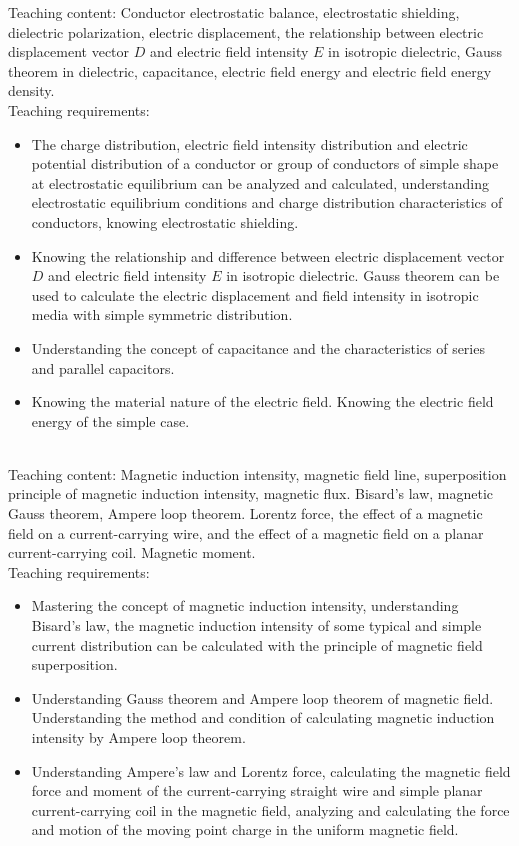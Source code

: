\documentclass[10pt,a4paper,oneside]{article}
\begin{document}
Teaching content: Conductor electrostatic balance, electrostatic shielding, dielectric polarization, electric displacement, the relationship between electric displacement vector $D$ and electric field intensity $E$ in isotropic dielectric, Gauss theorem in dielectric, capacitance, electric field energy and electric field energy density.\\

Teaching requirements:
\begin{itemize}
	\item The charge distribution, electric field intensity distribution and electric potential distribution of a conductor or group of conductors of simple shape at electrostatic equilibrium can be analyzed and calculated, understanding electrostatic equilibrium conditions and charge distribution characteristics of conductors, knowing electrostatic shielding.
	\item Knowing the relationship and difference between electric displacement vector $D$ and electric field intensity $E$ in isotropic dielectric. Gauss theorem can be used to calculate the electric displacement and field intensity in isotropic media with simple symmetric distribution.
	\item Understanding the concept of capacitance and the characteristics of series and parallel capacitors.
	\item Knowing the material nature of the electric field. Knowing the electric field energy of the simple case.
\end{itemize}
\\

Teaching content: Magnetic induction intensity, magnetic field line, superposition principle of magnetic induction intensity, magnetic flux. Bisard's law, magnetic Gauss theorem, Ampere loop theorem. Lorentz force, the effect of a magnetic field on a current-carrying wire, and the effect of a magnetic field on a planar current-carrying coil. Magnetic moment.\\

Teaching requirements:
\begin{itemize}
	\item Mastering the concept of magnetic induction intensity, understanding Bisard's law, the magnetic induction intensity of some typical and simple current distribution can be calculated with the principle of magnetic field superposition.
	\item Understanding Gauss theorem and Ampere loop theorem of magnetic field. Understanding the method and condition of calculating magnetic induction intensity by Ampere loop theorem.
	\item Understanding Ampere's law and Lorentz force, calculating the magnetic field force and moment of the current-carrying straight wire and simple planar current-carrying coil in the magnetic field, analyzing and calculating the force and motion of the moving point charge in the uniform magnetic field.
\end{itemize}
\\
\end{document}
